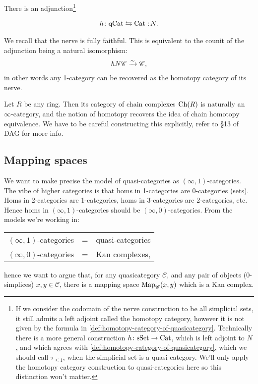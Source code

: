 \documentclass[11pt,openany]{book}
\begin{document}
\begin{proposition}\label{prop:nerve-adjunction}
There is an adjunction\footnote{%
If we consider the codomain of the nerve construction to be all simplicial sets, it still admits a left adjoint called the homotopy category, however it is not given by the formula in \autoref{def:homotopy-category-of-quasicategory}. Technically there is a more general construction $h \colon \mathrm{sSet}\to \mathrm{Cat}$, which is left adjoint to $N$, and which agrees with \autoref{def:homotopy-category-of-quasicategory}, which we should call $\tau_{\le 1}$, when the simplicial set is a quasi-category. We'll only apply the homotopy category construction to quasi-categories here so this distinction won't matter.
}


\begin{align*}
    h\colon \qCat \leftrightarrows \Cat \noloc N.
\end{align*}
\end{proposition}

\begin{remark} We recall that the nerve is fully faithful. This is equivalent to the counit of the adjunction being a natural isomorphism:
\begin{align*}
    hN\mathscr{C} \xrightarrow{\sim} \mathscr{C},
\end{align*}
in other words any 1-category can be recovered as the homotopy category of its nerve.
\end{remark}

\begin{example} Let $R$ be any ring. Then its category of chain complexes $\mathrm{Ch}(R)$ is naturally an $\infty$-category, and the notion of homotopy recovers the idea of chain homotopy equivalence. We have to be careful constructing this explicitly, refer to \S13 of DAG for more info.
\end{example}


\subsection{Mapping spaces}


We want to make precise the model of quasi-categories as $(\infty,1)$-categories. The vibe of higher categories is that homs in 1-categories are 0-categories (sets). Homs in 2-categories are 1-categories, homs in 3-categories are 2-categories, etc. Hence homs in $(\infty,1)$-categories should be $(\infty,0)$-categories. From the models we're working in:

\begin{center} 
\begin{tabular}{l  l  l}
$(\infty,1)$-categories & = & quasi-categories \\
$(\infty,0)$-categories & = & Kan complexes,
\end{tabular}
\end{center}
hence we want to argue that, for any quasicategory $\mathscr{C}$, and any pair of objects (0-simplices) $x,y\in \mathscr{C}$, there is a mapping space $\mathrm{Map}_\mathscr{C}(x,y)$ which is a Kan complex.
\end{document}
